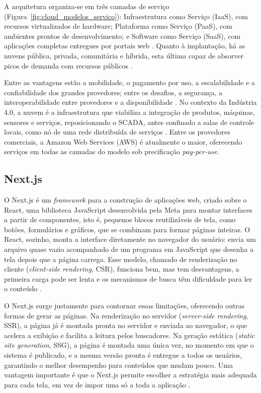 \par A arquitetura organiza-se em três camadas de serviço (Figura~\ref{fig:cloud_modelos_servico}): Infraestrutura como Serviço (IaaS), com recursos virtualizados de hardware; Plataforma como Serviço (PaaS), com ambientes prontos de desenvolvimento; e Software como Serviço (SaaS), com aplicações completas entregues por portais web \cite{PEDROSA2011_COMPUTACAO_NUVEM}. Quanto à implantação, há as nuvens pública, privada, comunitária e híbrida, esta última capaz de absorver picos de demanda com recursos públicos \cite{HENRIQUES2010_CLOUD_COMPUTING_TCC}.

\par Entre as vantagens estão a mobilidade, o pagamento por uso, a escalabilidade e a confiabilidade dos grandes provedores; entre os desafios, a segurança, a interoperabilidade entre provedores e a disponibilidade \cite{HENRIQUES2010_CLOUD_COMPUTING_TCC,PEDROSA2011_COMPUTACAO_NUVEM}. No contexto da Indústria 4.0, a nuvem é a infraestrutura que viabiliza a integração de produtos, máquinas, sensores e serviços, reposicionando o SCADA, antes confinado a salas de controle locais, como nó de uma rede distribuída de serviços \cite{BIGHETI2020,PISCHING2017}. Entre os provedores comerciais, a Amazon Web Services (AWS) é atualmente o maior, oferecendo serviços em todas as camadas do modelo sob precificação \emph{pay-per-use}.

\subsection{Next.js}

\par O Next.js é um \emph{framework} para a construção de aplicações web, criado sobre o React, uma biblioteca JavaScript desenvolvida pela Meta para montar interfaces a partir de componentes, isto é, pequenos blocos reutilizáveis de tela, como botões, formulários e gráficos, que se combinam para formar páginas inteiras. O React, sozinho, monta a interface diretamente no navegador do usuário: envia um arquivo quase vazio acompanhado de um programa em JavaScript que desenha a tela depois que a página carrega. Esse modelo, chamado de renderização no cliente (\emph{client-side rendering}, CSR), funciona bem, mas tem desvantagens, a primeira carga pode ser lenta e os mecanismos de busca têm dificuldade para ler o conteúdo \cite{NEXTJS_DOCS}.

\par O Next.js surge justamente para contornar essas limitações, oferecendo outras formas de gerar as páginas. Na renderização no servidor (\emph{server-side rendering}, SSR), a página já é montada pronta no servidor e enviada ao navegador, o que acelera a exibição e facilita a leitura pelos buscadores. Na geração estática (\emph{static site generation}, SSG), a página é montada uma única vez, no momento em que o sistema é publicado, e a mesma versão pronta é entregue a todos os usuários, garantindo o melhor desempenho para conteúdos que mudam pouco. Uma vantagem importante é que o Next.js permite escolher a estratégia mais adequada para cada tela, em vez de impor uma só a toda a aplicação \cite{NEXTJS_DOCS}.

